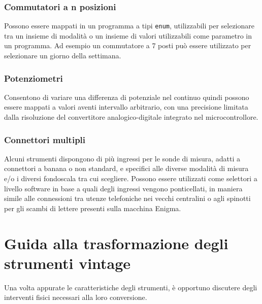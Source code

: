 \documentclass[12pt,a4paper]{report}
\begin{document}
\subsection{Commutatori a n posizioni}
Possono essere mappati in un programma a tipi \texttt{enum}, utilizzabili per selezionare tra un insieme di modalità o un insieme di valori
utilizzabili come parametro in un programma. Ad esempio un commutatore a 7 posti può essere utilizzato per selezionare un giorno della
settimana.

\subsection{Potenziometri}
Consentono di variare una differenza di potenziale nel continuo quindi possono essere mappati a valori aventi intervallo arbitrario, con una precisione limitata dalla risoluzione del convertitore analogico-digitale integrato nel microcontrollore.

\subsection{Connettori multipli}
Alcuni strumenti dispongono di più ingressi per le sonde di misura, adatti a connettori a banana o non standard, e specifici alle
diverse modalità di misura e/o i diversi fondoscala tra cui scegliere. Possono essere utilizzati come selettori a livello software in base a
quali degli ingressi vengono ponticellati, in maniera simile alle connessioni tra utenze telefoniche nei vecchi centralini o agli spinotti per
gli scambi di lettere presenti sulla macchina Enigma.



\chapter{Guida alla trasformazione degli strumenti vintage}





Una volta appurate le caratteristiche degli strumenti, è opportuno discutere degli interventi fisici necessari alla loro conversione.
\end{document}
